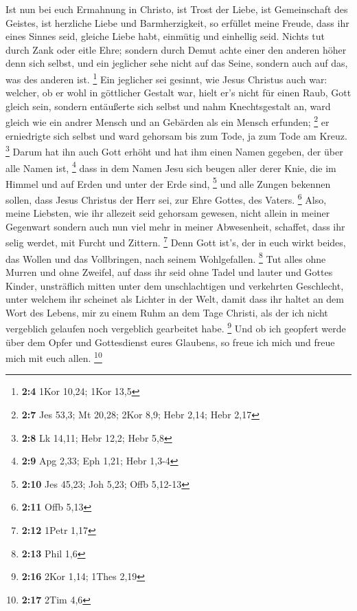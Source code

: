  Ist nun bei euch Ermahnung in Christo, ist Trost der
Liebe, ist Gemeinschaft des Geistes, ist herzliche Liebe und
Barmherzigkeit,  so erfüllet meine Freude, dass ihr eines
Sinnes seid, gleiche Liebe habt, einmütig und einhellig seid.
 Nichts tut durch Zank oder eitle Ehre; sondern durch
Demut achte einer den anderen höher denn sich selbst,  und
ein jeglicher sehe nicht auf das Seine, sondern auch auf das, was des
anderen ist. \footnote{\textbf{2:4} 1Kor 10,24; 1Kor 13,5}
 Ein jeglicher sei gesinnt, wie Jesus Christus auch war:
 welcher, ob er wohl in göttlicher Gestalt war, hielt er's
nicht für einen Raub, Gott gleich sein,  sondern
entäußerte sich selbst und nahm Knechtsgestalt an, ward gleich wie ein
andrer Mensch und an Gebärden als ein Mensch erfunden; \footnote{\textbf{2:7}
  Jes 53,3; Mt 20,28; 2Kor 8,9; Hebr 2,14; Hebr 2,17}  er
erniedrigte sich selbst und ward gehorsam bis zum Tode, ja zum Tode am
Kreuz. \footnote{\textbf{2:8} Lk 14,11; Hebr 12,2; Hebr 5,8}
 Darum hat ihn auch Gott erhöht und hat ihm einen Namen
gegeben, der über alle Namen ist, \footnote{\textbf{2:9} Apg 2,33; Eph
  1,21; Hebr 1,3-4}  dass in dem Namen Jesu sich beugen
aller derer Knie, die im Himmel und auf Erden und unter der Erde sind,
\footnote{\textbf{2:10} Jes 45,23; Joh 5,23; Offb 5,12-13}
 und alle Zungen bekennen sollen, dass Jesus Christus der
Herr sei, zur Ehre Gottes, des Vaters. \footnote{\textbf{2:11} Offb 5,13}
 Also, meine Liebsten, wie ihr allezeit seid gehorsam
gewesen, nicht allein in meiner Gegenwart sondern auch nun viel mehr in
meiner Abwesenheit, schaffet, dass ihr selig werdet, mit Furcht und
Zittern. \footnote{\textbf{2:12} 1Petr 1,17}  Denn Gott
ist's, der in euch wirkt beides, das Wollen und das Vollbringen, nach
seinem Wohlgefallen. \footnote{\textbf{2:13} Phil 1,6} 
Tut alles ohne Murren und ohne Zweifel,  auf dass ihr
seid ohne Tadel und lauter und Gottes Kinder, unsträflich mitten unter
dem unschlachtigen und verkehrten Geschlecht, unter welchem ihr scheinet
als Lichter in der Welt,  damit dass ihr haltet an dem
Wort des Lebens, mir zu einem Ruhm an dem Tage Christi, als der ich
nicht vergeblich gelaufen noch vergeblich gearbeitet habe. \footnote{\textbf{2:16}
  2Kor 1,14; 1Thes 2,19}  Und ob ich geopfert werde über
dem Opfer und Gottesdienst eures Glaubens, so freue ich mich und freue
mich mit euch allen. \footnote{\textbf{2:17} 2Tim 4,6} 
